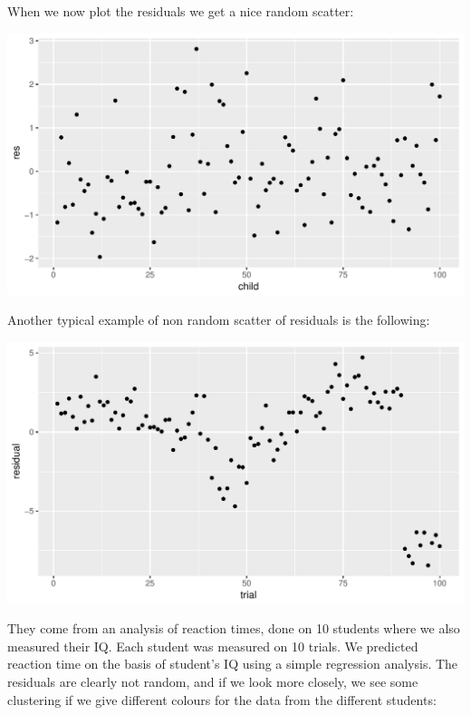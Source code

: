 \documentclass[]{report}\usepackage[]{graphicx}\usepackage[]{color}
\makeatletter
\def\maxwidth{ %
  \ifdim\Gin@nat@width>\linewidth
    \linewidth
  \else
    \Gin@nat@width
  \fi
}
\newenvironment{knitrout}{}{} %
\makeatother
\begin{document}
When we now plot the residuals we get a nice random scatter:

\begin{knitrout}
\color{fgcolor}

{\centering \includegraphics[width=\maxwidth]{figure/fig18888-1} 

}



\end{knitrout}


Another typical example of non random scatter of residuals is the following:

\begin{knitrout}
\color{fgcolor}

{\centering \includegraphics[width=\maxwidth]{figure/fig1413-1} 

}



\end{knitrout}

They come from an analysis of reaction times, done on 10 students where we also measured their IQ. Each student was measured on 10 trials. We predicted reaction time on the basis of student's IQ using a simple regression analysis. The residuals are clearly not random, and if we look more closely, we see some clustering if we give different colours for the data from the different students:
\end{document}
